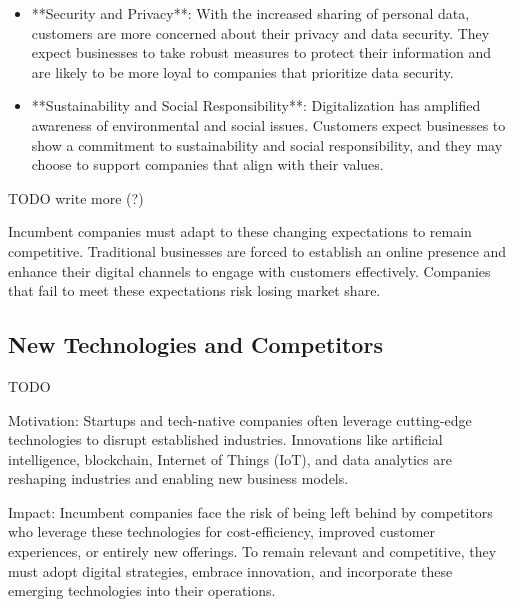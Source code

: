 \documentclass[a4]{scrartcl}
\begin{document}
\begin{itemize}
	\item **Security and Privacy**: With the increased sharing of personal data, customers are more concerned about their privacy and data security. They expect businesses to take robust measures to protect their information and are likely to be more loyal to companies that prioritize data security.
	
	\item **Sustainability and Social Responsibility**: Digitalization has amplified awareness of environmental and social issues. Customers expect businesses to show a commitment to sustainability and social responsibility, and they may choose to support companies that align with their values.
\end{itemize}






TODO write more (?)	
	
		
Incumbent companies must adapt to these changing expectations to remain competitive. Traditional businesses are forced to establish an online presence and enhance their digital channels to engage with  customers effectively. Companies that fail to meet these expectations risk losing market share. \cite{masterthesis,digitalmatrix, leadingdigital}

	
	
	
\subsection{New Technologies and Competitors} \label{subsec:NewTechnologiesandCompetitors}

	TODO

	Motivation: Startups and tech-native companies often leverage cutting-edge technologies to disrupt established industries. Innovations like artificial intelligence, blockchain, Internet of Things (IoT), and data analytics are reshaping industries and enabling new business models.
	
	
	
	Impact: Incumbent companies face the risk of being left behind by competitors who leverage these technologies for cost-efficiency, improved customer experiences, or entirely new offerings. To remain relevant and competitive, they must adopt digital strategies, embrace innovation, and incorporate these emerging technologies into their operations.
	
	
\end{document}
